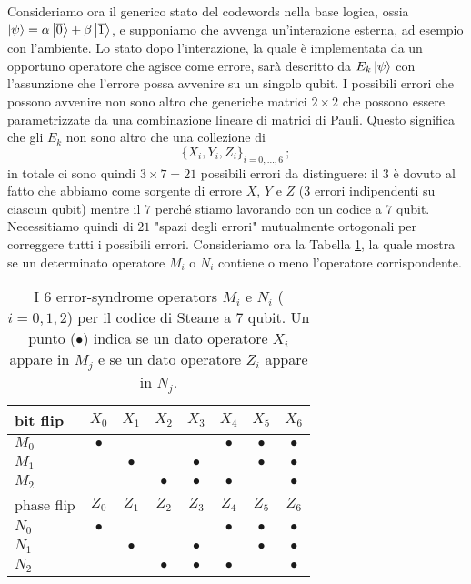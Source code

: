 \noindent Consideriamo ora il generico stato del codewords nella base logica, ossia $\ket \psi=\alpha \ket{\overline 0} + \beta \ket{\overline 1}$, e supponiamo che avvenga un'interazione esterna, ad esempio con l'ambiente. Lo stato dopo l'interazione, la quale è implementata da un opportuno operatore che agisce come errore, sarà descritto da $E_k\ket \psi$ con l'assunzione che l'errore possa avvenire su un singolo qubit. I possibili errori che possono avvenire non sono altro che generiche matrici $2 \times 2$ che possono essere parametrizzate da una combinazione lineare di matrici di Pauli. Questo significa che gli $E_k$ non sono altro che una collezione di 
\begin{equation*}
    \{X_i, Y_i, Z_i \}_{i=0,\dots,6} \, ;
\end{equation*}
in totale ci sono quindi $3 \times 7 = 21$ possibili errori da distinguere: il $3$ è dovuto al fatto che abbiamo come sorgente di errore $X$, $Y$ e $Z$ (3 errori indipendenti su ciascun qubit) mentre il $7$ perché stiamo lavorando con un codice a $7$ qubit. Necessitiamo quindi di $21$ "spazi degli errori" mutualmente ortogonali per correggere tutti i possibili errori. Consideriamo ora la Tabella \ref{tab:steane-bit-flip-cases}, la quale mostra se un determinato operatore $M_i$ o $N_i$ contiene o meno l'operatore corrispondente.  

\begin{table}[!ht]
	\centering
    \begin{tabular}{lccccccc}
        \toprule
        bit flip & $X_0$     & $X_1$     & $X_2$     & $X_3$     & $X_4$     & $X_5$     & $X_6$    \\
        \midrule
        $M_0$    & $\bullet$ &           &           &           & $\bullet$ & $\bullet$ & $\bullet$ \\
        $M_1$    &           & $\bullet$ &           & $\bullet$ &           & $\bullet$ & $\bullet$ \\
        $M_2$    &           &           & $\bullet$ & $\bullet$ & $\bullet$ &           & $\bullet$ \\
        \toprule
        phase flip & $Z_0$     & $Z_1$     & $Z_2$     & $Z_3$     & $Z_4$     & $Z_5$     & $Z_6$    \\
        \midrule
        $N_0$      & $\bullet$ &           &           &           & $\bullet$ & $\bullet$ & $\bullet$ \\
        $N_1$      &           & $\bullet$ &           & $\bullet$ &           & $\bullet$ & $\bullet$ \\
        $N_2$      &           &           & $\bullet$ & $\bullet$ & $\bullet$ &           & $\bullet$          \\
        \bottomrule
    \end{tabular}\\
    \caption{I 6 error-syndrome operators $M_i$ e $N_i$ ($i = 0, 1, 2$) per il codice di Steane a 7 qubit. Un punto ($\bullet$) indica se un dato operatore $X_i$ appare in $M_j$ e se un dato operatore $Z_i$ appare in $N_j$.}
    \label{tab:steane-bit-flip-cases}
\end{table}

